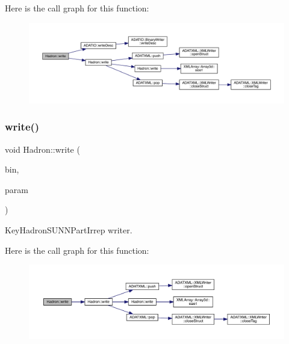 Here is the call graph for this function\+:
\nopagebreak
\begin{figure}[H]
\begin{center}
\leavevmode
\includegraphics[width=350pt]{d1/daf/namespaceHadron_aa05ac649ec39cb98483ab55274129758_cgraph}
\end{center}
\end{figure}
\mbox{\label{namespaceHadron_a1ab9211268895b4f05c4d46ff18dff6d}} 
\subsubsection{\texorpdfstring{write()}{write()}\hspace{0.1cm}{\footnotesize\ttfamily [83/95]}}
{\footnotesize\ttfamily void Hadron\+::write (\begin{DoxyParamCaption}\item[{\mbox{\hyperlink{classADATIO_1_1BinaryWriter}{Binary\+Writer}} \&}]{bin,  }\item[{const \mbox{\hyperlink{structHadron_1_1KeyHadronSUNNPartIrrepOp__t}{Key\+Hadron\+S\+U\+N\+N\+Part\+Irrep\+Op\+\_\+t}} \&}]{param }\end{DoxyParamCaption})}



Key\+Hadron\+S\+U\+N\+N\+Part\+Irrep writer. 

Here is the call graph for this function\+:
\nopagebreak
\begin{figure}[H]
\begin{center}
\leavevmode
\includegraphics[width=350pt]{d1/daf/namespaceHadron_a1ab9211268895b4f05c4d46ff18dff6d_cgraph}
\end{center}
\end{figure}
\mbox{\label{namespaceHadron_aa056cb1973613af20ddde740db299944}} 

